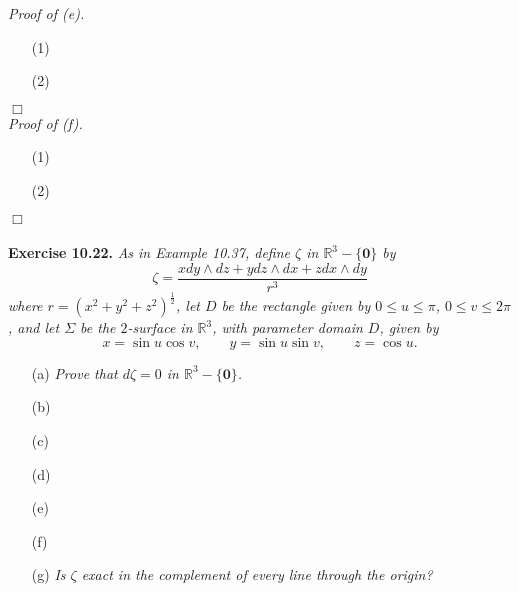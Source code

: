 \documentclass{article}
\begin{document}
\emph{Proof of (e).}
\begin{enumerate}
\item[(1)]
\item[(2)]

\end{enumerate}
$\Box$ \\



\emph{Proof of (f).}
\begin{enumerate}
\item[(1)]
\item[(2)]

\end{enumerate}
$\Box$ \\\\






\textbf{Exercise 10.22.}
\emph{As in Example 10.37, define $\zeta$ in $\mathbb{R}^3-\{\mathbf{0}\}$ by
\[
  \zeta = \frac{x dy \wedge dz + y dz \wedge dx + z dx \wedge dy}{r^3}
\]
where $r = (x^2+y^2+z^2)^{\frac{1}{2}}$,
let $D$ be the rectangle given by $0 \leq u \leq \pi$, $0 \leq v \leq 2\pi$,
and let $\Sigma$ be the $2$-surface in $\mathbb{R}^3$,
with parameter domain $D$, given by
\[
  x = \sin u \cos v,
  \qquad
  y = \sin u \sin v,
  \qquad
  z = \cos u.
\]}

\begin{enumerate}
\item[(a)]
  \emph{Prove that $d\zeta = 0$ in $\mathbb{R}^3 - \{ \mathbf{0} \}$.}

\item[(b)]

\item[(c)]

\item[(d)]

\item[(e)]

\item[(f)]

\item[(g)]
  \emph{Is $\zeta$ exact in the complement of every line through the origin?} \\
\end{enumerate}
\end{document}
